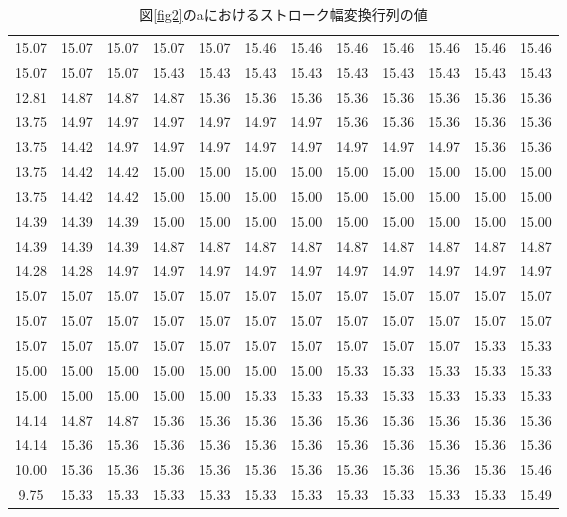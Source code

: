 \documentclass[uplatex, twocolumn,10pt]{jsarticle}
\begin{document}
\begin{table}[tp]
    \centering
    \caption{図\ref{fig2}のaにおけるストローク幅変換行列の値}
    \label{table1}
    \begin{tabular}{cccccccccccc}
        \hline
        15.07 & 15.07 & 15.07 & 15.07 & 15.07 & 15.46 & 15.46 & 15.46 & 15.46 & 15.46 & 15.46 & 15.46 \\
        15.07 & 15.07 & 15.07 & 15.43 & 15.43 & 15.43 & 15.43 & 15.43 & 15.43 & 15.43 & 15.43 & 15.43 \\
        12.81 & 14.87 & 14.87 & 14.87 & 15.36 & 15.36 & 15.36 & 15.36 & 15.36 & 15.36 & 15.36 & 15.36 \\
        13.75 & 14.97 & 14.97 & 14.97 & 14.97 & 14.97 & 14.97 & 15.36 & 15.36 & 15.36 & 15.36 & 15.36 \\
        13.75 & 14.42 & 14.97 & 14.97 & 14.97 & 14.97 & 14.97 & 14.97 & 14.97 & 14.97 & 15.36 & 15.36 \\
        13.75 & 14.42 & 14.42 & 15.00 & 15.00 & 15.00 & 15.00 & 15.00 & 15.00 & 15.00 & 15.00 & 15.00 \\
        13.75 & 14.42 & 14.42 & 15.00 & 15.00 & 15.00 & 15.00 & 15.00 & 15.00 & 15.00 & 15.00 & 15.00 \\
        14.39 & 14.39 & 14.39 & 15.00 & 15.00 & 15.00 & 15.00 & 15.00 & 15.00 & 15.00 & 15.00 & 15.00 \\
        14.39 & 14.39 & 14.39 & 14.87 & 14.87 & 14.87 & 14.87 & 14.87 & 14.87 & 14.87 & 14.87 & 14.87 \\
        14.28 & 14.28 & 14.97 & 14.97 & 14.97 & 14.97 & 14.97 & 14.97 & 14.97 & 14.97 & 14.97 & 14.97 \\
        15.07 & 15.07 & 15.07 & 15.07 & 15.07 & 15.07 & 15.07 & 15.07 & 15.07 & 15.07 & 15.07 & 15.07 \\
        15.07 & 15.07 & 15.07 & 15.07 & 15.07 & 15.07 & 15.07 & 15.07 & 15.07 & 15.07 & 15.07 & 15.07 \\
        15.07 & 15.07 & 15.07 & 15.07 & 15.07 & 15.07 & 15.07 & 15.07 & 15.07 & 15.07 & 15.33 & 15.33 \\
        15.00 & 15.00 & 15.00 & 15.00 & 15.00 & 15.00 & 15.00 & 15.33 & 15.33 & 15.33 & 15.33 & 15.33 \\
        15.00 & 15.00 & 15.00 & 15.00 & 15.00 & 15.33 & 15.33 & 15.33 & 15.33 & 15.33 & 15.33 & 15.33 \\
        14.14 & 14.87 & 14.87 & 15.36 & 15.36 & 15.36 & 15.36 & 15.36 & 15.36 & 15.36 & 15.36 & 15.36 \\
        14.14 & 15.36 & 15.36 & 15.36 & 15.36 & 15.36 & 15.36 & 15.36 & 15.36 & 15.36 & 15.36 & 15.36 \\
        10.00 & 15.36 & 15.36 & 15.36 & 15.36 & 15.36 & 15.36 & 15.36 & 15.36 & 15.36 & 15.36 & 15.46 \\
        9.75  & 15.33 & 15.33 & 15.33 & 15.33 & 15.33 & 15.33 & 15.33 & 15.33 & 15.33 & 15.33 & 15.49 \\
        \hline
    \end{tabular}
\end{table}
\end{document}
